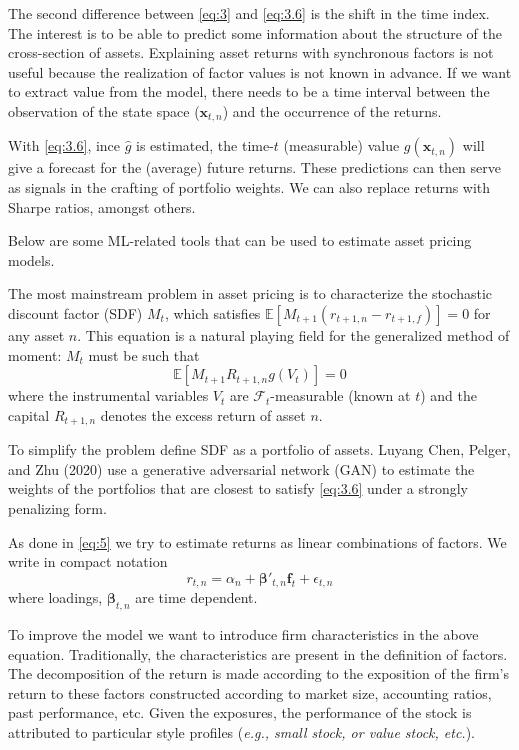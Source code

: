 The second difference between \eqref{eq:3} and \eqref{eq:3.6} is the shift in the time index. The interest is to be able to predict some information about the structure of the cross-section of assets. Explaining asset returns with synchronous factors is not useful because the realization of factor values is not known in advance. If we want to extract value from the model, there needs to be a time interval between the observation of the state space ($\mathbf{x}_{t,n}$) and the occurrence of the returns. 

With \eqref{eq:3.6}, ince $\hat{g}$ is estimated, the time-$t$ (measurable) value $g(\mathbf{x}_{t,n})$ will give a forecast for the (average) future returns. These predictions can then serve as signals in the crafting of portfolio weights. We can also replace returns with Sharpe ratios, amongst others.

Below are some ML-related tools that can be used to estimate asset pricing models.

\begin{thm}
  The most mainstream problem in asset pricing is to characterize the stochastic discount factor (SDF) $M_{t}$, which satisfies $\mathbb{E}[M_{t+1}(r_{t+1,n} - r_{t+1,f})] = 0$ for any asset $n$. This equation is a natural playing field for the generalized method of moment: $M_{t}$ must be such that
  \begin{equation}
    \mathbb{E}[M_{t+1}R_{t+1,n}g(V_{t})] = 0 \label{eq:3.6}
  \end{equation}
  where the instrumental variables $V_{t}$ are $\mathcal{F}_t$-measurable (known at $t$) and the capital $R_{t+1,n}$ denotes the excess return of asset $n$.
\end{thm}

To simplify the problem define SDF as a portfolio of assets. Luyang Chen, Pelger, and Zhu (2020) use a generative adversarial network (GAN) to estimate the weights of the portfolios that are closest to satisfy \eqref{eq:3.6} under a strongly penalizing form. 

\begin{thm}
  As done in \eqref{eq:5} we try to estimate returns as linear combinations of factors. We write in compact notation
  \[
    r_{t,n} = \alpha _{n} + \boldsymbol{\beta}'_{t,n} \mathbf{f}_{t} + \epsilon_{t,n}
  \]
  where loadings, $\boldsymbol{\beta}_{t,n}$ are time dependent. 
\end{thm}

To improve the model we want to introduce firm characteristics in the above equation. Traditionally, the characteristics are present in the definition of factors. The decomposition of the return is made according to the exposition of the firm's return to these factors constructed according to market size, accounting ratios, past performance, etc. Given the exposures, the performance of the stock is attributed to particular style profiles (\textit{e.g., small stock, or value stock, etc.}).

